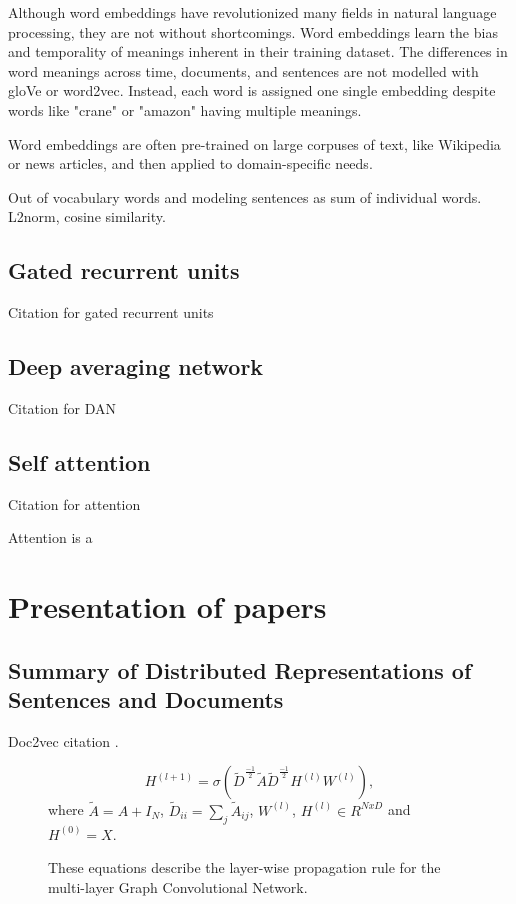 Although word embeddings have revolutionized many fields in natural language processing, they are not without shortcomings. Word embeddings learn the bias and temporality of meanings inherent in their training dataset. The differences in word meanings  across time, documents, and sentences are not modelled with gloVe or word2vec. Instead, each word is assigned one single embedding despite words like "crane" or "amazon" having multiple meanings. 

Word embeddings are often pre-trained on large corpuses of text, like Wikipedia or news articles, and then applied to domain-specific needs. 

Out of vocabulary words and modeling sentences as sum of individual words. L2norm, cosine similarity.


\subsection{Gated recurrent units}

Citation for gated recurrent units \cite{gru}

\subsection{Deep averaging network}

Citation for DAN \cite{dan}

\subsection{Self attention}

Citation for attention \cite{attention}

Attention is a 

\section{\label{sec:level4} Presentation of papers}
\subsection{Summary of Distributed Representations of Sentences and Documents}
Doc2vec citation \cite{conf/icml/LeM14}.
\begin{figure}
\centering
$$H^{(l+1)} = \sigma (\widetilde{D}^{\frac{-1}{2}}\widetilde{A}\widetilde{D}^{\frac{-1}{2}}H^{(l)}W^{(l)}),$$ where $\widetilde{A} = A + I_N$, $\widetilde{D}_{ii} = \sum_{j}\widetilde{A}_{ij}$, $W^{(l)}$, $H^{(l)} \in R^{NxD}$ and $H^{(0)} = X$. 
\caption{These equations describe the layer-wise propagation rule for the multi-layer Graph Convolutional Network.}
\label{fig:gcn}
\end{figure}

